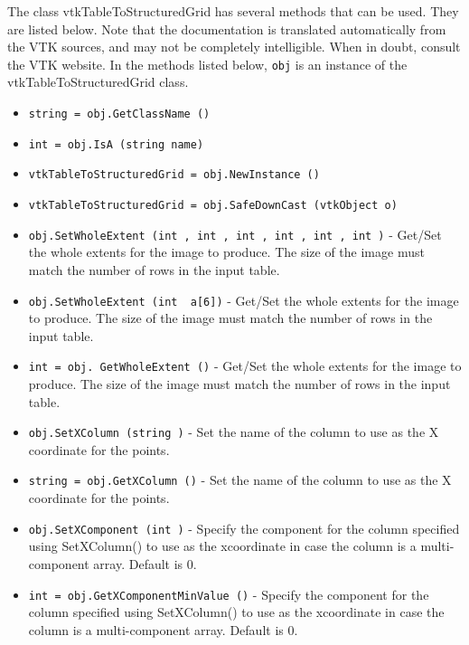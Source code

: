 The class vtkTableToStructuredGrid has several methods that can be used.
  They are listed below.
Note that the documentation is translated automatically from the VTK sources,
and may not be completely intelligible.  When in doubt, consult the VTK website.
In the methods listed below, \verb|obj| is an instance of the vtkTableToStructuredGrid class.
\begin{itemize}
\item  \verb|string = obj.GetClassName ()|

\item  \verb|int = obj.IsA (string name)|

\item  \verb|vtkTableToStructuredGrid = obj.NewInstance ()|

\item  \verb|vtkTableToStructuredGrid = obj.SafeDownCast (vtkObject o)|

\item  \verb|obj.SetWholeExtent (int , int , int , int , int , int )| -  Get/Set the whole extents for the image to produce. The size of the image
 must match the number of rows in the input table.

\item  \verb|obj.SetWholeExtent (int  a[6])| -  Get/Set the whole extents for the image to produce. The size of the image
 must match the number of rows in the input table.

\item  \verb|int = obj. GetWholeExtent ()| -  Get/Set the whole extents for the image to produce. The size of the image
 must match the number of rows in the input table.

\item  \verb|obj.SetXColumn (string )| -  Set the name of the column to use as the X coordinate for the points. 

\item  \verb|string = obj.GetXColumn ()| -  Set the name of the column to use as the X coordinate for the points. 

\item  \verb|obj.SetXComponent (int )| -  Specify the component for the column specified using SetXColumn() to
 use as the xcoordinate in case the column is a multi-component array.
 Default is 0.

\item  \verb|int = obj.GetXComponentMinValue ()| -  Specify the component for the column specified using SetXColumn() to
 use as the xcoordinate in case the column is a multi-component array.
 Default is 0.


\end{itemize}

